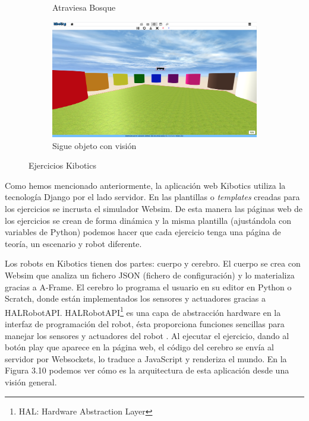 \begin{figure}[H]
\begin{subfigure}{.5\textwidth}
  \caption{Atraviesa Bosque}
  \label{fig:sub-third}
\end{subfigure}
\begin{subfigure}{.5\textwidth}
  \centering
  \includegraphics[width=.95\linewidth]{chapters/images/colores.png}  
  \caption{Sigue objeto con visión}
  \label{fig:sub-fourth}
\end{subfigure}
\caption{Ejercicios Kibotics}
\label{fig:partes robot}
\end{figure}

Como hemos mencionado anteriormente, la aplicación web Kibotics utiliza la tecnología Django por el lado servidor. En las plantillas o \textit{templates} creadas para los ejercicios se incrusta el simulador Websim. De esta manera  las páginas web de los ejercicios se crean de forma dinámica y la misma plantilla (ajustándola con variables de Python) podemos hacer que cada ejercicio tenga una página de teoría, un escenario y robot diferente.

Los robots en Kibotics tienen dos partes: cuerpo y cerebro. El cuerpo se crea con Websim que analiza un fichero JSON (fichero de configuración) y lo materializa gracias a A-Frame. El cerebro lo programa el usuario en su editor en Python o Scratch, donde están implementados los sensores y actuadores gracias a HALRobotAPI. HALRobotAPI\footnote{HAL: Hardware Abstraction Layer} es una capa de abstracción hardware  en la interfaz de programación del robot, ésta proporciona funciones sencillas para manejar los sensores y actuadores del robot . Al ejecutar el ejercicio, dando al botón play que aparece en la página web, el código del cerebro se envía al servidor por Websockets, lo traduce a JavaScript y renderiza el mundo. En la Figura 3.10 podemos ver cómo es la arquitectura de esta aplicación desde una visión general. 

